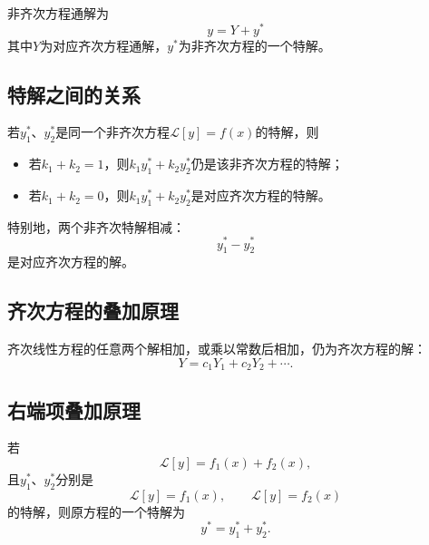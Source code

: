 \documentclass[UTF8,zihao=-4]{ctexart}
\begin{document}
非齐次方程通解为
\begin{equation}
\boxed{y=Y+y^*}
\end{equation}
其中\(Y\)为对应齐次方程通解，\(y^*\)为非齐次方程的一个特解。

\subsection{特解之间的关系}

若\(y_1^*\)、\(y_2^*\)是同一个非齐次方程\(\mathcal L[y]=f(x)\)的特解，则
\begin{itemize}
  \item 若\(k_1+k_2=1\)，则\(k_1y_1^*+k_2y_2^*\)仍是该非齐次方程的特解；
  \item 若\(k_1+k_2=0\)，则\(k_1y_1^*+k_2y_2^*\)是对应齐次方程的特解。
\end{itemize}
特别地，两个非齐次特解相减：
\[
 y_1^*-y_2^*
\]
是对应齐次方程的解。

\subsection{齐次方程的叠加原理}

齐次线性方程的任意两个解相加，或乘以常数后相加，仍为齐次方程的解：
\begin{equation}
Y=c_1Y_1+c_2Y_2+\cdots.
\end{equation}

\subsection{右端项叠加原理}

若
\[
\mathcal L[y]=f_1(x)+f_2(x),
\]
且\(y_1^*\)、\(y_2^*\)分别是
\[
\mathcal L[y]=f_1(x),\qquad \mathcal L[y]=f_2(x)
\]
的特解，则原方程的一个特解为
\begin{equation}
 y^*=y_1^*+y_2^*.
\end{equation}
\end{document}
